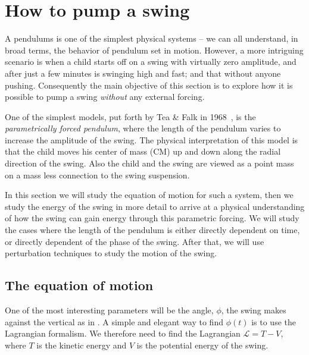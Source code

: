 \documentclass[11pt,letter, swedish, english,%
]{article}
\begin{document}





\section{How to pump a swing}
A pendulums is one of the simplest physical systems -- we can all
understand, in broad terms, the behavior of pendulum set in
motion. However, a more intriguing scenario is when a child starts off
on a swing with virtually zero amplitude, and after just a few minutes
is swinging high and fast; and that without anyone pushing.
Consequently the main objective of this section is to explore how it
is possible to pump a swing \emph{without} any external forcing. 

One of the simplest models, put forth by Tea \& Falk in
1968~\cite{Tea_Falk_1968}, is the \emph{parametrically forced
  pendulum}, where the length of the pendulum varies to increase the
amplitude of the swing. The physical interpretation of this model is
that the child moves his center of mass (CM) up and down along the radial
direction of the swing. Also the child and the swing are viewed as a
point mass on a mass less connection to the swing suspension. 

In this section we will study the equation of motion for such a system,
then we study the energy of the swing in more detail to arrive at a
physical understanding of how the swing can gain energy through this
parametric forcing. We will study the cases where the length of the
pendulum is either directly dependent on time, or directly dependent
of the phase of the swing.
After that, we will use 
perturbation techniques to study the motion of the swing.

\subsection{The equation of motion}
One of the most interesting parameters will be the angle, $\phi$,
the swing makes against the vertical as in . 
A simple and elegant way to find $\phi(t)$ is to use the Lagrangian
formalism. We therefore need to find the Lagrangian $\mathcal{L}=T-V$,
where $T$ is the kinetic energy and $V$ is the potential energy of the
swing. 
\end{document}
